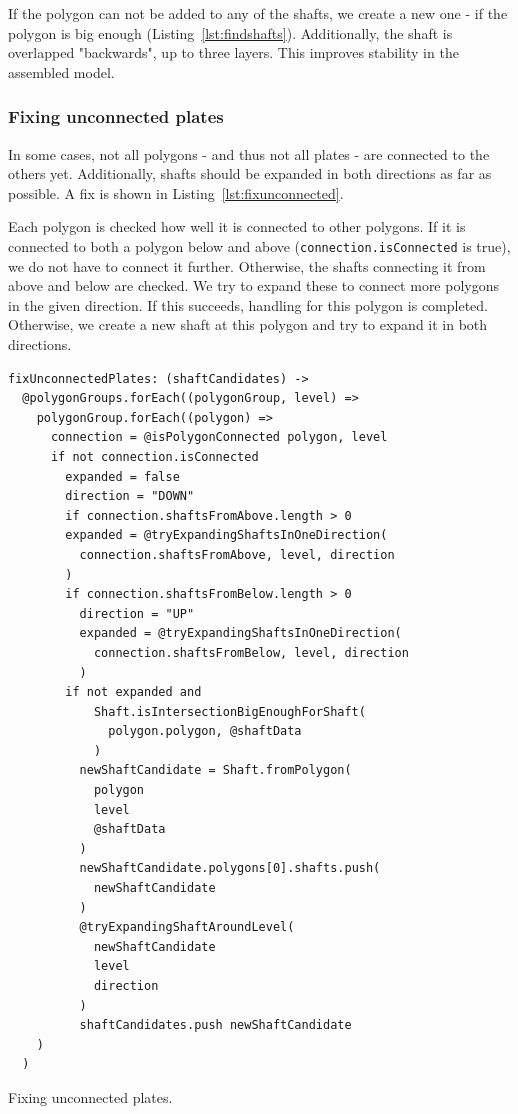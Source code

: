 \documentclass[../ClassicThesis.tex]{subfiles}
\begin{document}
If the polygon can not be added to any of the shafts, we create a new one - if the polygon is big enough (Listing~\ref{lst:findshafts}). Additionally, the shaft is overlapped "backwards", up to three layers. This improves stability in the assembled model.

\subsubsection{Fixing unconnected plates}

In some cases, not all polygons - and thus not all plates - are connected to the others yet. Additionally, shafts should be expanded in both directions as far as possible. A fix is shown in Listing~\ref{lst:fixunconnected}.

Each polygon is checked how well it is connected to other polygons. If it is connected to both a polygon below and above (\texttt{connection.isConnected} is true), we do not have to connect it further. Otherwise, the shafts connecting it from above and below are checked. We try to expand these to connect more polygons in the given direction. If this succeeds, handling for this polygon is completed. Otherwise, we create a new shaft at this polygon and try to expand it in both directions.

\begin{listing}
\begin{verbatim}
fixUnconnectedPlates: (shaftCandidates) ->
  @polygonGroups.forEach((polygonGroup, level) =>
    polygonGroup.forEach((polygon) =>
      connection = @isPolygonConnected polygon, level
      if not connection.isConnected
        expanded = false
        direction = "DOWN"
        if connection.shaftsFromAbove.length > 0
        expanded = @tryExpandingShaftsInOneDirection(
          connection.shaftsFromAbove, level, direction
        )
        if connection.shaftsFromBelow.length > 0
          direction = "UP"
          expanded = @tryExpandingShaftsInOneDirection(
            connection.shaftsFromBelow, level, direction
          )
        if not expanded and 
            Shaft.isIntersectionBigEnoughForShaft(
              polygon.polygon, @shaftData
            )
          newShaftCandidate = Shaft.fromPolygon(
            polygon
            level
            @shaftData
          )
          newShaftCandidate.polygons[0].shafts.push(
            newShaftCandidate
          )
          @tryExpandingShaftAroundLevel(
            newShaftCandidate
            level
            direction
          )
          shaftCandidates.push newShaftCandidate
    )
  )
\end{verbatim}
\caption{Fixing unconnected plates.}
\label{lst:fixunconnected}
\end{listing}
\end{document}
